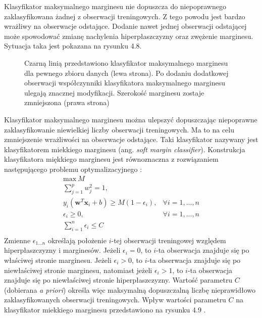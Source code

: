 \documentclass[notitlepage]{report}
\begin{document}
Klasyfikator maksymalnego marginesu nie dopuszcza do niepoprawnego zaklasyfikowana żadnej z obserwacji treningowych. Z tego powodu jest bardzo wrażliwy na obserwacje odstające. Dodanie nawet jednej obserwacji odstającej może spowodować zmianę nachylenia hiperpłaszczyzny oraz zwężenie marginesu. Sytuacja taka jest pokazana na rysunku 4.8.
\begin{figure}[H]
	\centering
	\caption{Czarną linią przedstawiono klasyfikator maksymalnego marginesu dla pewnego zbioru danych (lewa strona). Po dodaniu dodatkowej obserwacji współczynniki klasyfikatora maksymalnego marginesu ulegają znacznej modyfikacji. Szerokość marginesu zostaje zmniejszona (prawa strona) \cite{islr}}
\end{figure}
Klasyfikator maksymalnego marginesu można ulepszyć dopuszczając niepoprawne zaklasyfikowanie niewielkiej liczby obserwacji treningowych. Ma to na celu zmniejszenie wrażliwości na obserwacje odstające. Taki klasyfikator nazywany jest klasyfikatorem miekkiego marginesu (ang. \textit{soft margin classifier}). Konstrukcja klasyfikatora miękkiego marginesu jest równoznaczna z rozwiązaniem następującego problemu optymalizacyjnego \cite{islr}:
\begin{equation}
\begin{array}{ll}
\text{max}\ M &\\
\sum_{j=1}^{p} w_{j}^{2} = 1, \\
y_i(\mathbf{w}^T\mathbf{x}_i + b) \ge M(1 - \epsilon_i), & \forall i = 1,...,n \\
\epsilon_i \ge 0, & \forall i = 1,...,n  \\
\sum_{i=1}^{n} \epsilon_i \le C\\ 
\end{array}
\end{equation}
Zmienne $\epsilon_{1...n}$ określają położenie $i$-tej obserwacji treningowej względem hiperpłaszczyzny i marginesów. Jeżeli $\epsilon_i = 0$, to $i$-ta obserwacja znajduje się po właściwej stronie marginesu. Jeżeli $\epsilon_i > 0$, to $i$-ta obserwacja znajduje się po niewłaściwej stronie marginesu, natomiast jeżeli $\epsilon_i > 1$, to  $i$-ta obserwacja znajduje się po niewłaściwej stronie hiperpłaszczyzny. Wartość parametru $C$ (dobierana \textit{a priori}) określa więc maksymalną dopuszczalną liczbę nieprawidłowo zaklasyfikowanych obserwacji treningowych. Wpływ wartości parametru $C$ na klasyfikator miekkiego marginesu przedstawiono na rysunku 4.9 \cite{islr}.
\end{document}
